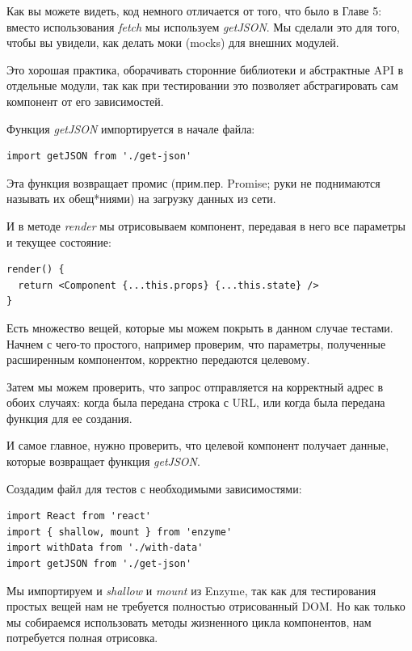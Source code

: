 Как вы можете видеть, код немного отличается от того, что было в Главе 5: вместо использования \textit{fetch} мы используем \textit{getJSON}. Мы сделали это для того, чтобы вы увидели, как делать моки (mocks) для внешних модулей.

Это хорошая практика, оборачивать сторонние библиотеки и абстрактные API в отдельные модули, так как при тестировании это позволяет абстрагировать сам компонент от его зависимостей.

Функция \textit{getJSON} импортируется в начале файла:

\begin{lstlisting}
import getJSON from './get-json'
\end{lstlisting}

Эта функция возвращает промис (прим.пер. Promise; руки не поднимаются называть их обещ*ниями) на загрузку данных из сети.

И в методе \textit{render} мы отрисовываем компонент, передавая в него все параметры и текущее состояние:

\begin{lstlisting}
render() {
  return <Component {...this.props} {...this.state} />
}
\end{lstlisting}

Есть множество вещей, которые мы можем покрыть в данном случае тестами. Начнем с чего-то простого, например проверим, что параметры, полученные расширенным компонентом, корректно передаются целевому.

Затем мы можем проверить, что запрос отправляется на корректный адрес в обоих случаях: когда была передана строка с URL, или когда была передана функция для ее создания.

И самое главное, нужно проверить, что целевой компонент получает данные, которые возвращает функция \textit{getJSON}.

Создадим файл для тестов с необходимыми зависимостями:

\begin{lstlisting}
import React from 'react'
import { shallow, mount } from 'enzyme'
import withData from './with-data'
import getJSON from './get-json'
\end{lstlisting}

Мы импортируем и \textit{shallow} и \textit{mount} из Enzyme, так как для тестирования простых вещей нам не требуется полностью отрисованный DOM. Но как только мы собираемся использовать методы жизненного цикла компонентов, нам потребуется полная отрисовка.

